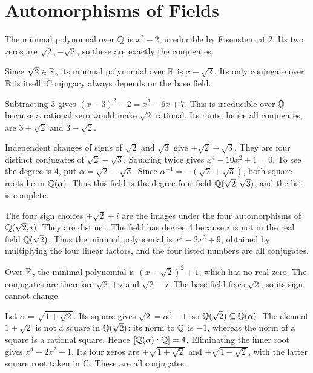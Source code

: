 \section{Automorphisms of Fields}

The minimal polynomial over $\mathbb{Q}$ is $x^2-2$, irreducible by Eisenstein at 2. Its two zeros are $\sqrt2,-\sqrt2$, so these are exactly the conjugates.

Since $\sqrt2\in\mathbb{R}$, its minimal polynomial over $\mathbb{R}$ is $x-\sqrt2$. Its only conjugate over $\mathbb{R}$ is itself. Conjugacy always depends on the base field.

Subtracting 3 gives $(x-3)^2-2=x^2-6x+7$. This is irreducible over $\mathbb{Q}$ because a rational zero would make $\sqrt2$ rational. Its roots, hence all conjugates, are $3+\sqrt2$ and $3-\sqrt2$.

Independent changes of signs of $\sqrt2$ and $\sqrt3$ give $\pm\sqrt2\pm\sqrt3$. They are four distinct conjugates of $\sqrt2-\sqrt3$. Squaring twice gives $x^4-10x^2+1=0$. To see the degree is 4, put $\alpha=\sqrt2-\sqrt3$. Since $\alpha^{-1}=-(\sqrt2+\sqrt3)$, both square roots lie in $\mathbb{Q}(\alpha)$. Thus this field is the degree-four field $\mathbb{Q}(\sqrt2,\sqrt3)$, and the list is complete.

The four sign choices $\pm\sqrt2\pm i$ are the images under the four automorphisms of $\mathbb{Q}(\sqrt2,i)$. They are distinct. The field has degree 4 because $i$ is not in the real field $\mathbb{Q}(\sqrt2)$. Thus the minimal polynomial is $x^4-2x^2+9$, obtained by multiplying the four linear factors, and the four listed numbers are all conjugates.

Over $\mathbb{R}$, the minimal polynomial is $(x-\sqrt2)^2+1$, which has no real zero. The conjugates are therefore $\sqrt2+i$ and $\sqrt2-i$. The base field fixes $\sqrt2$, so its sign cannot change.

Let $\alpha=\sqrt{1+\sqrt2}$. Its square gives $\sqrt2=\alpha^2-1$, so $\mathbb{Q}(\sqrt2)\subseteq\mathbb{Q}(\alpha)$. The element $1+\sqrt2$ is not a square in $\mathbb{Q}(\sqrt2)$: its norm to $\mathbb{Q}$ is $-1$, whereas the norm of a square is a rational square. Hence $[\mathbb{Q}(\alpha):\mathbb{Q}]=4$. Eliminating the inner root gives $x^4-2x^2-1$. Its four zeros are $\pm\sqrt{1+\sqrt2}$ and $\pm\sqrt{1-\sqrt2}$, with the latter square root taken in $\mathbb{C}$. These are all conjugates.

